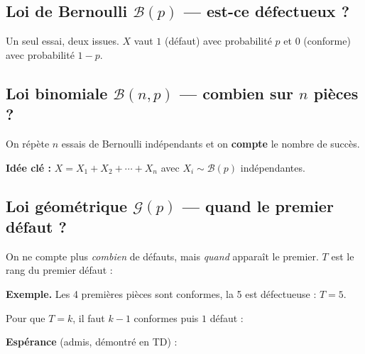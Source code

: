\subsection*{Loi de Bernoulli $\mathcal{B}(p)$ --- \og est-ce défectueux ?\fg{}}

Un seul essai, deux issues.
$X$ vaut $1$ (défaut) avec probabilité $p$
et $0$ (conforme) avec probabilité $1-p$.

\atrou[3cm]{%
\[
  E[X] = 0 \cdot (1-p) + 1 \cdot p = p.
\]
\[
  E[X^2] = 0^2 \cdot (1-p) + 1^2 \cdot p = p
  \;\;\implies\;\;
  \text{Var}(X) = p - p^2 = p(1-p).
\]
}

\subsection*{Loi binomiale $\mathcal{B}(n,p)$ --- \og combien sur $n$ pièces ?\fg{}}

On répète $n$ essais de Bernoulli indépendants
et on \textbf{compte} le nombre de succès.

\medskip

\textbf{Idée clé :}
$X = X_1 + X_2 + \cdots + X_n$
avec $X_i \sim \mathcal{B}(p)$ indépendantes.


\subsection*{Loi géométrique $\mathcal{G}(p)$
  --- \og quand le premier défaut ?\fg{}}

On ne compte plus \emph{combien} de défauts,
mais \emph{quand} apparaît le premier.
$T$ est le rang du premier défaut :

\medskip

\textbf{Exemple.}
Les 4 premières pièces sont conformes,
la 5 est défectueuse : $T = 5$.

\medskip

Pour que $T = k$, il faut $k-1$ conformes puis $1$ défaut :

\atrou[2.5cm]{%
\[
  P(T = k) = \underbrace{(1-p)^{k-1}}_{\text{$k-1$ conformes}}
  \times\; p,
  \qquad k \geq 1.
\]
}

\textbf{Espérance} (admis, démontré en TD) :

